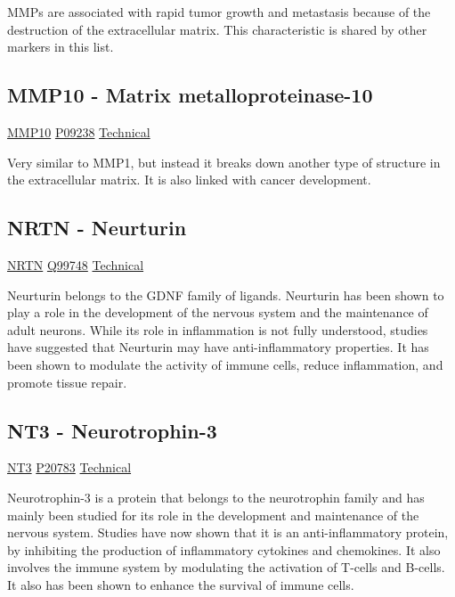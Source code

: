 MMPs are associated with rapid tumor growth and metastasis because of the destruction of the extracellular matrix. This characteristic is shared by other markers in this list.

\subsection{MMP10 - Matrix metalloproteinase-10}
\label{in:MMP10}

\href{https://en.wikipedia.org/wiki/Matrix\_metalloproteinase}{MMP10}
\href{http://www.uniprot.org/uniprot/P09238}{P09238}
\href{https://olink.com/products-services/target/protein/?assayID=5101}{Technical}

Very similar to MMP1, but instead it breaks down another type of structure in the extracellular matrix. It is also linked with cancer development.

\subsection{NRTN - Neurturin}

\href{https://en.wikipedia.org/wiki/Neurturin}{NRTN}
\href{http://www.uniprot.org/uniprot/Q99748}{Q99748}
\href{https://olink.com/products-services/target/protein/?assayID=5124}{Technical}

Neurturin belongs to the GDNF family of ligands. Neurturin has been shown to play a role in the development of the nervous system and the maintenance of adult neurons. While its role in inflammation is not fully understood, studies have suggested that Neurturin may have anti-inflammatory properties. It has been shown to modulate the activity of immune cells, reduce inflammation, and promote tissue repair.

\subsection{NT3 - Neurotrophin-3}

\href{https://en.wikipedia.org/wiki/Neurotrophin-3}{NT3}
\href{http://www.uniprot.org/uniprot/P20783}{P20783}
\href{https://olink.com/products-services/target/protein/?assayID=5119}{Technical}

Neurotrophin-3 is a protein that belongs to the neurotrophin family and has mainly been studied for its role in the development and maintenance of the nervous system. Studies have now shown that it is an anti-inflammatory protein, by inhibiting the production of inflammatory cytokines and chemokines. It also involves the immune system by modulating the activation of T-cells and B-cells. It also has been shown to enhance the survival of immune cells.

